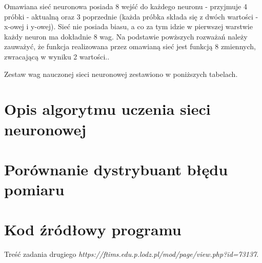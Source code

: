 \documentclass{classrep}
\begin{document}
Omawiana sieć neuronowa posiada 8 wejść do każdego neuronu - przyjmuje 4 próbki - aktualną oraz 3 poprzednie (każda próbka składa się z dwóch wartości - x-owej i y-owej). Sieć nie posiada biasu, a co za tym idzie w pierwszej warstwie każdy neuron ma  dokładnie 8 wag. Na podstawie powższych rozważań należy zauważyć, że funkcja realizowana przez omawianą sieć jest funkcją 8 zmiennych, zwracającą w wyniku 2 wartości.\newline.

Zestaw wag nauczonej sieci neuronowej zestawiono w poniższych tabelach. 



\section{Opis algorytmu uczenia sieci neuronowej}

\section{Porównanie dystrybuant błędu pomiaru}

\section{Kod źródłowy programu}



\begin{thebibliography}{1}
Treść zadania drugiego\newline
\textit{https://ftims.edu.p.lodz.pl/mod/page/view.php?id=73137}. 

\end{thebibliography}
\end{document}
